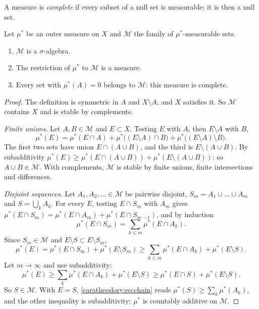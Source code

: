 \begin{notechapter}
A measure is \emph{complete} if every subset of a null set is
measurable; it is then a null set.

\begin{theorem}\label{caratheodory:thm:caratheodory}
Let $\mu^*$ be an outer measure on $X$ and $\mathcal M$ the family of
$\mu^*$-measurable sets.
\begin{enumerate}[nosep]
  \item $\mathcal M$ is a $\sigma$-algebra.
  \item The restriction of $\mu^*$ to $\mathcal M$ is a measure.
  \item Every set with $\mu^*(A) = 0$ belongs to $\mathcal M$: this
        measure is complete.
\end{enumerate}
\end{theorem}

\begin{proof}
The definition is symmetric in $A$ and $X\setminus A$, and $X$
satisfies it. So $\mathcal M$ contains $X$ and is stable by
complements.

\emph{Finite unions.} Let $A, B\in\mathcal M$ and $E\subset X$. Testing
$E$ with $A$, then $E\setminus A$ with $B$,
\[
  \mu^*(E) = \mu^*(E\cap A) + \mu^*\bigl((E\setminus A)\cap B\bigr)
  + \mu^*\bigl((E\setminus A)\setminus B\bigr) .
\]
The first two sets have union $E\cap(A\cup B)$, and the third is
$E\setminus(A\cup B)$. By subadditivity
$\mu^*(E)\geq\mu^*(E\cap(A\cup B)) + \mu^*(E\setminus(A\cup B))$: so
$A\cup B\in\mathcal M$. With complements, $\mathcal M$ is stable by
finite unions, finite intersections and differences.

\emph{Disjoint sequences.} Let $A_1, A_2, \dots\in\mathcal M$ be
pairwise disjoint, $S_m = A_1\cup\dots\cup A_m$ and $S = \bigcup_kA_k$.
For every $E$, testing $E\cap S_m$ with $A_m$ gives
$\mu^*(E\cap S_m) = \mu^*(E\cap A_m) + \mu^*(E\cap S_{m-1})$, and by
induction
\[
  \mu^*(E\cap S_m) = \sum_{k\leq m}\mu^*(E\cap A_k) .
\]
Since $S_m\in\mathcal M$ and $E\setminus S\subset E\setminus S_m$,
\[
  \mu^*(E) = \mu^*(E\cap S_m) + \mu^*(E\setminus S_m)
  \geq\sum_{k\leq m}\mu^*(E\cap A_k) + \mu^*(E\setminus S) .
\]
Let $m\to\infty$ and use subadditivity:
\begin{equation}\label{caratheodory:eq:chain}
  \mu^*(E)\geq\sum_k\mu^*(E\cap A_k) + \mu^*(E\setminus S)
  \geq\mu^*(E\cap S) + \mu^*(E\setminus S) .
\end{equation}
So $S\in\mathcal M$. With $E = S$, \eqref{caratheodory:eq:chain} reads
$\mu^*(S)\geq\sum_k\mu^*(A_k)$, and the other inequality is
subadditivity: $\mu^*$ is countably additive on $\mathcal M$.


\end{proof}
\end{notechapter}
